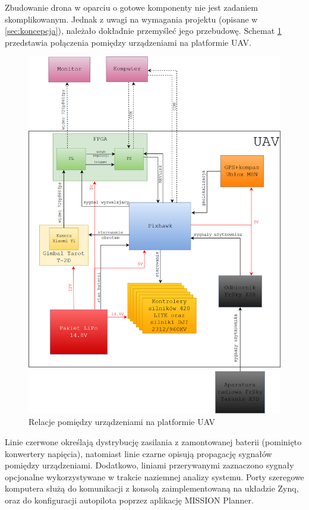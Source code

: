Zbudowanie drona w oparciu o gotowe komponenty nie jest zadaniem skomplikowanym. 
Jednak z uwagi na wymagania projektu (opisane w \ref{sec:koncepcja}), należało dokładnie przemyśleć jego przebudowę. %
Schemat \ref{fig:architecture} przedstawia połączenia pomiędzy urządzeniami na platformie UAV.  %
\begin{figure}[]
	\centering
	\includegraphics[width=15cm]{5_drone_architecture.png}
	\caption{Relacje pomiędzy urządzeniami na platformie UAV}
	\label{fig:architecture}
\end{figure}
Linie czerwone określają dystrybucję zasilania z zamontowanej baterii (pominięto konwertery napięcia), natomiast linie czarne opisują propagację sygnałów pomiędzy urządzeniami. Dodatkowo, liniami przerywanymi zaznaczono sygnały opcjonalne wykorzystywane w trakcie naziemnej analizy systemu. Porty szeregowe komputera służą do komunikacji z konsolą zaimplementowaną na układzie Zynq, oraz do konfiguracji autopilota poprzez aplikację MISSION Planner.

